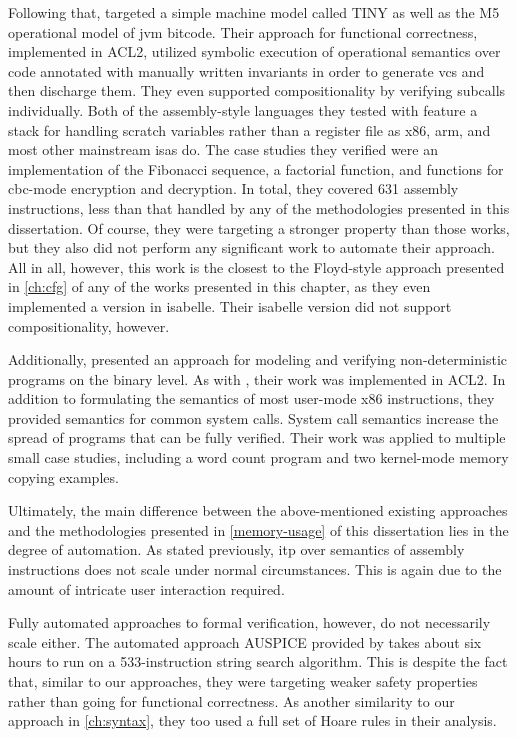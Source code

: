 Following that, \textcite{matthews2006verification}
targeted a simple machine model called TINY
as well as the M5 operational model of \ac{jvm} bitcode.
Their approach for functional correctness, implemented in ACL2,
utilized symbolic execution of operational semantics
over code annotated with manually written invariants
in order to generate \acp{vc} and then discharge them.
They even supported compositionality by verifying subcalls individually.
Both of the assembly-style languages they tested with feature a stack
for handling scratch variables rather than a register file
as \gls{x86}, \gls{arm}, and most other mainstream \acp{isa} do.
The case studies they verified were an implementation of the Fibonacci sequence,
a factorial function, and functions for \ac{cbc}-mode encryption and decryption.
In total, they covered \num{631} assembly instructions,
less than that handled by any of the methodologies presented in this dissertation.
Of course, they were targeting a stronger property than those works,
but they also did not perform any significant work to automate their approach.
All in all, however, this work is the closest to the Floyd-style approach
presented in \cref{ch:cfg} of any of the works presented in this chapter,
as they even implemented a version in \gls{isabelle}. Their \gls{isabelle} version did not support compositionality, however.

Additionally, \textcite{goel2014syscalls,goelphd} presented an approach for modeling and verifying
non-deterministic programs on the binary level.
As with \textcite{matthews2006verification}, their work was implemented in ACL2.
In addition to formulating the semantics of most user-mode \gls{x86} instructions,
they provided semantics for common system calls.
System call semantics increase the spread of programs that can be fully verified.
Their work was applied to multiple small case studies,
including a word count program and two kernel-mode memory copying examples.

Ultimately, the main difference between the above-mentioned existing approaches
and the methodologies presented in \cref{memory-usage} of this dissertation lies in the degree of automation.
As stated previously, \ac{itp} over semantics of assembly instructions
does not scale under normal circumstances.
This is again due to the amount of intricate user interaction required.

Fully automated approaches to formal verification, however,
do not necessarily scale either.
The automated approach AUSPICE provided by \textcite{tan2015auspice}
takes about six hours to run on a \num{533}-instruction string search algorithm.
This is despite the fact that, similar to our approaches, %
they were targeting weaker safety properties
rather than going for functional correctness.
As another similarity to our approach in \cref{ch:syntax},
they too used a full set of Hoare rules in their analysis.

